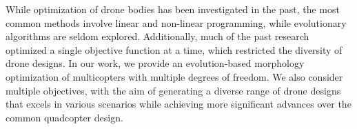 While optimization of drone bodies has been investigated in the past, the most common methods involve linear and non-linear programming, while evolutionary algorithms are seldom explored. Additionally, much of the past research optimized a single objective function at a time, which restricted the diversity of drone designs. In our work, we provide an evolution-based morphology optimization of multicopters with multiple degrees of freedom. We also consider multiple objectives, with the aim of generating a diverse range of drone designs that excels in various scenarios while achieving more significant advances over the common quadcopter design.
